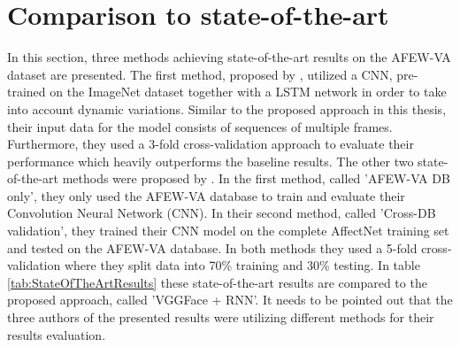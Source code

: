 \section{Comparison to state-of-the-art} \label{sec:StateOfTheArtComparison}
In this section, three methods achieving state-of-the-art results on the AFEW-VA dataset are presented. The first method, proposed by \citet{Theagarajan:2018:DeepDriver}, utilized a CNN, pre-trained on the ImageNet dataset together with a LSTM network in order to take into account dynamic variations. Similar to the proposed approach in this thesis, their input data for the model consists of sequences of multiple frames. Furthermore, they used a 3-fold cross-validation approach to evaluate their performance which heavily outperforms the baseline results.
\newline\newline
The other two state-of-the-art methods were proposed by \citet{Handrich:2020:SimultaneousPredVA}. In the first method, called 'AFEW-VA DB only', they only used the AFEW-VA database to train and evaluate their Convolution Neural Network (CNN). In their second method, called 'Cross-DB validation', they trained their CNN model on the complete AffectNet training set and tested on the AFEW-VA database. In both methods they used a 5-fold cross-validation where they split data into 70\% training and 30\% testing.
\newline\newline
In table \ref{tab:StateOfTheArtResults} these state-of-the-art results are compared to the proposed approach, called 'VGGFace + RNN'. It needs to be pointed out that the three authors of the presented results were utilizing different methods for their results evaluation.

